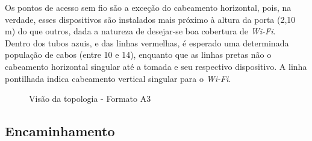 \documentclass[	DIV=calc,%
							paper=a4,%
							fontsize=12pt,%
							onecolumn]{scrartcl}	 					%
\begin{document}
Os pontos de acesso sem fio são a exceção do cabeamento horizontal, pois, na verdade, esses dispositivos são instalados mais próximo à altura da porta (2,10 m) do que outros, dada a natureza de desejar-se boa cobertura de \textit{Wi-Fi}.
\\

Dentro dos tubos azuis, e das linhas vermelhas, é esperado uma determinada população de cabos (entre 10 e 14), enquanto que as linhas pretas não o cabeamento horizontal singular até a tomada e seu respectivo dispositivo. A linha pontilhada indica cabeamento vertical singular para o \textit{Wi-Fi}.



\clearpage
\thispagestyle{plain}
\recalctypearea

\begin{figure}
	\noindent{}
	\caption{Visão da topologia - Formato A3}
	\label{fig3}
\end{figure}

\clearpage
{}
\recalctypearea


\subsection{Encaminhamento}
\end{document}
